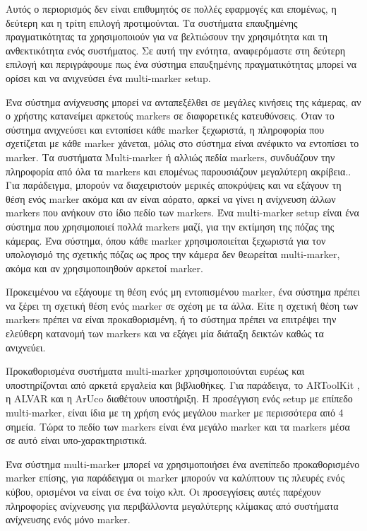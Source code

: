 Αυτός ο περιορισμός δεν είναι επιθυμητός σε πολλές εφαρμογές και επομένως, η δεύτερη και η τρίτη επιλογή προτιμούνται. Τα συστήματα επαυξημένης πραγματικότητας τα χρησιμοποιούν για να βελτιώσουν την χρησιμότητα και τη ανθεκτικότητα ενός συστήματος.
Σε αυτή την ενότητα, αναφερόμαστε στη δεύτερη επιλογή και περιγράφουμε πως ένα σύστημα επαυξημένης πραγματικότητας μπορεί να ορίσει και να ανιχνεύσει ένα multi-marker setup. 

Ένα σύστημα ανίχνευσης μπορεί να ανταπεξέλθει σε μεγάλες κινήσεις της κάμερας, αν ο χρήστης κατανείμει αρκετούς markers σε διαφορετικές κατευθύνσεις. Όταν το σύστημα ανιχνεύσει και εντοπίσει κάθε marker ξεχωριστά, η πληροφορία που σχετίζεται με κάθε marker χάνεται, μόλις στο σύστημα είναι ανέφικτο να εντοπίσει το marker. 
Τα συστήματα Multi-marker ή αλλιώς πεδία markers, συνδυάζουν την πληροφορία από όλα τα markers και επομένως παρουσιάζουν μεγαλύτερη ακρίβεια.\cite{yoon2006increasing}. Για παράδειγμα, μπορούν να διαχειριστούν μερικές αποκρύψεις και να εξάγουν τη θέση ενός marker ακόμα και αν είναι αόρατο, αρκεί να γίνει η ανίχνευση άλλων markers που ανήκουν στο ίδιο πεδίο των markers. Ένα multi-marker setup είναι ένα σύστημα που χρησιμοποιεί πολλά markers μαζί, για την εκτίμηση της πόζας της κάμερας. Ένα σύστημα, όπου κάθε marker χρησιμοποιείται ξεχωριστά για τον υπολογισμό της σχετικής πόζας ως προς την κάμερα δεν θεωρείται multi-marker, ακόμα και αν χρησιμοποιηθούν αρκετοί marker.

Προκειμένου να εξάγουμε τη θέση ενός μη εντοπισμένου marker, ένα σύστημα πρέπει να ξέρει τη σχετική θέση ενός marker σε σχέση με τα άλλα. Είτε η σχετική θέση των markers πρέπει να είναι προκαθορισμένη, ή το σύστημα πρέπει να επιτρέψει την ελεύθερη κατανομή των markers και να εξάγει μία διάταξη δεικτών καθώς τα ανιχνεύει. 

Προκαθορισμένα συστήματα multi-marker χρησιμοποιούνται ευρέως και υποστηρίζονται από αρκετά εργαλεία και βιβλιοθήκες. Για παράδειγα, το ARToolKit \cite{artoolkit}, η ALVAR \cite{alvar} και η ArUco\cite{aruco} διαθέτουν υποστήριξη. Η προσέγγιση ενός setup με επίπεδο multi-marker, είναι ίδια με τη χρήση ενός μεγάλου marker με περισσότερα από 4 σημεία. Τώρα το πεδίο των markers είναι ένα μεγάλο marker και τα markers μέσα σε αυτό είναι υπο-χαρακτηριστικά. 

Ένα σύστημα multi-marker μπορεί να χρησιμοποιήσει ένα ανεπίπεδο προκαθορισμένο marker επίσης, για παράδειγμα οι marker μπορούν να καλύπτουν τις πλευρές ενός κύβου, ορισμένοι να είναι σε ένα τοίχο κλπ.\cite{uematsu2005ar}
Οι προσεγγίσεις αυτές παρέχουν πληροφορίες ανίχνευσης για περιβάλλοντα μεγαλύτερης κλίμακας από συστήματα ανίχνευσης ενός μόνο marker. 

